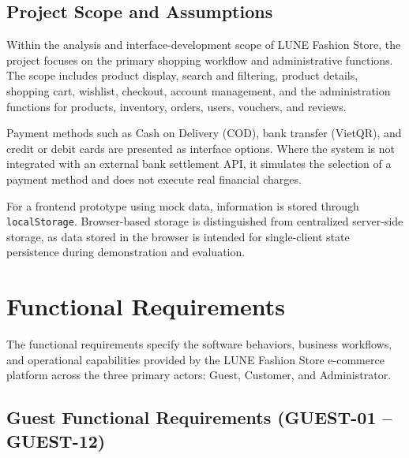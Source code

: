 \documentclass[12pt,a4paper,oneside]{report}
\begin{document}
\subsection{Project Scope and Assumptions}
Within the analysis and interface-development scope of LUNE Fashion Store, the project focuses on the primary shopping workflow and administrative functions. The scope includes product display, search and filtering, product details, shopping cart, wishlist, checkout, account management, and the administration functions for products, inventory, orders, users, vouchers, and reviews.

Payment methods such as Cash on Delivery (COD), bank transfer (VietQR), and credit or debit cards are presented as interface options. Where the system is not integrated with an external bank settlement API, it simulates the selection of a payment method and does not execute real financial charges.

For a frontend prototype using mock data, information is stored through \texttt{localStorage}. Browser-based storage is distinguished from centralized server-side storage, as data stored in the browser is intended for single-client state persistence during demonstration and evaluation.

\section{Functional Requirements}
The functional requirements specify the software behaviors, business workflows, and operational capabilities provided by the LUNE Fashion Store e-commerce platform across the three primary actors: Guest, Customer, and Administrator.

\subsection{Guest Functional Requirements (GUEST-01 -- GUEST-12)}
\end{document}
